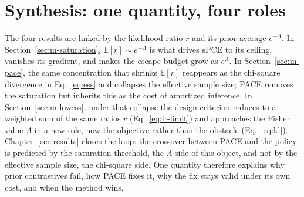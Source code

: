 \section{Synthesis: one quantity, four roles}
\label{sec:m-synthesis}

The four results are linked by the likelihood ratio $r$ and its prior average
$e^{-\Lambda}$. In Section~\ref{sec:m-saturation}, $\mathbb{E}[r]\sim e^{-\Lambda}$ is
what drives sPCE to its ceiling, vanishes its gradient, and makes the escape budget
grow as $e^{\Lambda}$. In Section~\ref{sec:m-pace}, the same concentration that shrinks
$\mathbb{E}[r]$ reappears as the chi-square divergence in Eq.~\eqref{eq:ess} and
collapses the effective sample size; PACE removes the saturation but inherits this as
the cost of amortized inference. In Section~\ref{sec:m-lowess}, under that collapse the
design criterion reduces to a weighted sum of the same ratios $r$
(Eq.~\eqref{eq:lr-limit}) and approaches the Fisher value $\Lambda$ in a new role, now
the objective rather than the obstacle (Eq.~\eqref{eq:kl}). Chapter~\ref{sec:results}
closes the loop: the crossover between PACE and the policy is predicted by the
saturation threshold, the $\Lambda$ side of this object, and not by the effective
sample size, the chi-square side. One quantity therefore explains why prior
contrastives fail, how PACE fixes it, why the fix stays valid under its own cost, and
when the method wins.
